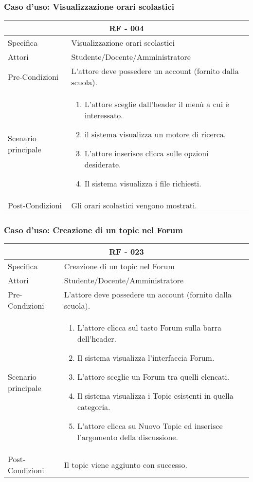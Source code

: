\documentclass{article}
\begin{document}
\subsubsection{\textbf{Caso d'uso: Visualizzazione orari scolastici}}
\begin{tabular}{ |p{3cm}|p{9cm}|  }
	\hline
	\multicolumn{2}{|c|}{\textbf{RF - 004}} \\
	\hline
	Specifica& Visualizzazione orari scolastici\\
	\hline
	Attori& Studente/Docente/Amministratore\\
	\hline
	Pre-Condizioni& L'attore deve possedere un account (fornito dalla scuola).\\
	\hline
	Scenario principale& \begin{enumerate}
		\item L'attore sceglie dall'header il menù a cui è interessato.
		\item il sistema visualizza un motore di ricerca.
		\item L'attore inserisce clicca sulle opzioni desiderate.
		\item Il sistema visualizza i file richiesti.
	\end{enumerate}\\
	\hline
	Post-Condizioni& Gli orari scolastici vengono mostrati.\\
	\hline
\end{tabular}
\subsubsection{\textbf{Caso d'uso: Creazione di un topic nel Forum}}
\begin{tabular}{ |p{3cm}|p{9cm}|  }
	\hline
	\multicolumn{2}{|c|}{\textbf{RF - 023}} \\
	\hline
	Specifica& Creazione di un topic nel Forum\\
	\hline
	Attori& Studente/Docente/Amministratore\\
	\hline
	Pre-Condizioni& L'attore deve possedere un account (fornito dalla scuola).\\
	\hline
	Scenario principale& \begin{enumerate}
		\item L'attore clicca sul tasto Forum sulla barra dell'header.
		\item Il sistema visualizza l'interfaccia Forum.
		\item L'attore sceglie un Forum tra quelli elencati.
		\item Il sistema visualizza i Topic esistenti in quella categoria.
		\item L'attore clicca su Nuovo Topic ed inserisce l'argomento della discussione.
	\end{enumerate}\\
	\hline
	Post-Condizioni& Il topic viene aggiunto con successo.\\
	\hline
\end{tabular}
\end{document}
